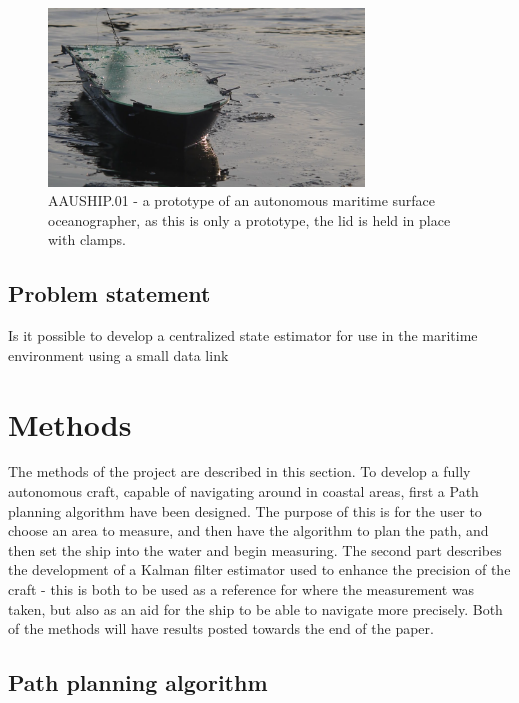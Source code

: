 \documentclass{ifacconf}
\begin{document}
\begin{figure}
	\begin{center}
		\includegraphics[width=8.4cm]{img/aauship.png} %
		\caption{AAUSHIP.01 - a prototype of an autonomous maritime surface oceanographer, as this is only a prototype, the lid is held in place with clamps. }  
		\label{fig:ship}
	\end{center}
\end{figure}

\subsection{Problem statement}
\begin{hypo} Is it possible to develop a centralized state estimator for use in the maritime environment using a small data link \end{hypo}

\section{Methods}

The methods of the project are described in this section. To develop a fully autonomous craft, capable of navigating around in coastal areas, first a Path planning algorithm have been designed. The purpose of this is for the user to choose an area to measure, and then have the algorithm to plan the path, and then set the ship into the water and begin measuring. The second part describes the development of a Kalman filter estimator used to enhance the precision of the craft - this is both to be used as a reference for where the measurement was taken, but also as an aid for the ship to be able to navigate more precisely. Both of the methods will have results posted towards the end of the paper. 

\subsection{Path planning algorithm}
\end{document}
